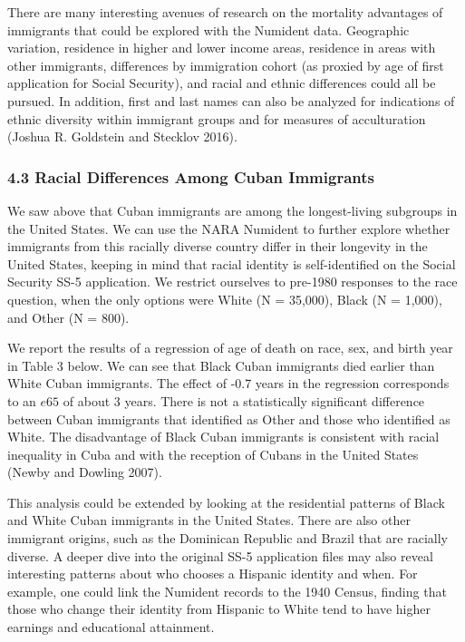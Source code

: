\documentclass[
  11pt,
]{article}
\begin{document}
There are many interesting avenues of research on the mortality
advantages of immigrants that could be explored with the Numident data.
Geographic variation, residence in higher and lower income areas,
residence in areas with other immigrants, differences by immigration
cohort (as proxied by age of first application for Social Security), and
racial and ethnic differences could all be pursued. In addition, first
and last names can also be analyzed for indications of ethnic diversity
within immigrant groups and for measures of acculturation (Joshua R.
Goldstein and Stecklov 2016).

\hypertarget{racial-differences-among-cuban-immigrants}{%
\subsubsection{4.3 Racial Differences Among Cuban
Immigrants}\label{racial-differences-among-cuban-immigrants}}

We saw above that Cuban immigrants are among the longest-living
subgroups in the United States. We can use the NARA Numident to further
explore whether immigrants from this racially diverse country differ in
their longevity in the United States, keeping in mind that racial
identity is self-identified on the Social Security SS-5 application. We
restrict ourselves to pre-1980 responses to the race question, when the
only options were White (N = 35,000), Black (N = 1,000), and Other (N =
800).

We report the results of a regression of age of death on race, sex, and
birth year in Table 3 below. We can see that Black Cuban immigrants died
earlier than White Cuban immigrants. The effect of -0.7 years in the
regression corresponds to an \(e65\) of about 3 years. There is not a
statistically significant difference between Cuban immigrants that
identified as Other and those who identified as White. The disadvantage
of Black Cuban immigrants is consistent with racial inequality in Cuba
and with the reception of Cubans in the United States (Newby and Dowling
2007).

This analysis could be extended by looking at the residential patterns
of Black and White Cuban immigrants in the United States. There are also
other immigrant origins, such as the Dominican Republic and Brazil that
are racially diverse. A deeper dive into the original SS-5 application
files may also reveal interesting patterns about who chooses a Hispanic
identity and when. For example, one could link the Numident records to
the 1940 Census, finding that those who change their identity from
Hispanic to White tend to have higher earnings and educational
attainment.
\end{document}
